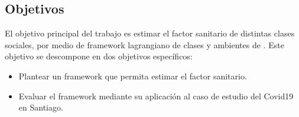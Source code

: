 \begin{intro}
\section*{Objetivos}

El objetivo principal del trabajo es estimar el factor sanitario de distintas clases sociales, por medio de framework lagrangiano de clases y ambientes de \cite{Bichara2018}. Este objetivo se descompone en dos objetivos específicos:
\begin{itemize}
    \item Plantear un framework que permita estimar el factor sanitario.
    \item Evaluar el framework mediante su aplicación al caso de estudio del Covid19 en Santiago.
\end{itemize}









\end{intro}

